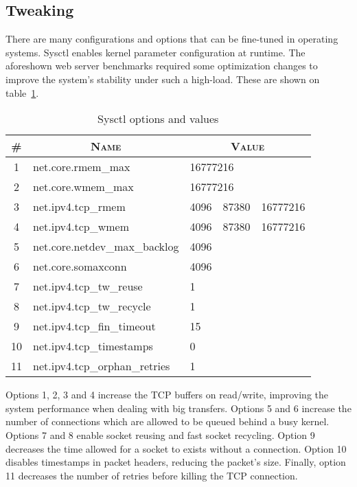 \subsection{Tweaking}
There are many configurations and options that can be fine-tuned in operating systems. Sysctl enables kernel parameter configuration at runtime. The aforeshown web server benchmarks required some optimization changes to improve the system's stability under such a high-load. These are shown on table~\ref{tab:sysctl}.
\begin{table}[ht]
  \centering
  
  \begin{tabular}{c|p{}|p{}}
  \multicolumn{1}{c|}{\textbf{\textsc{\#}}} & \multicolumn{1}{c|}{\textbf{\textsc{Name}}} & \multicolumn{1}{c}{\textbf{\textsc{Value}}} \\ \hline
  
  1 & net.core.rmem\_max & 16777216 \\ \hline
  2 & net.core.wmem\_max & 16777216 \\ \hline
  3 & net.ipv4.tcp\_rmem & 4096~\, 87380~\, 16777216 \\ \hline
  4 & net.ipv4.tcp\_wmem & 4096~\, 87380~\, 16777216 \\ \hline
  5 & net.core.netdev\_max\_backlog & 4096 \\ \hline
  6 & net.core.somaxconn & 4096 \\ \hline
  7 & net.ipv4.tcp\_tw\_reuse & 1 \\ \hline
  8 & net.ipv4.tcp\_tw\_recycle & 1 \\ \hline
  9 & net.ipv4.tcp\_fin\_timeout & 15 \\ \hline
  10 & net.ipv4.tcp\_timestamps & 0 \\ \hline
  11 & net.ipv4.tcp\_orphan\_retries & 1 \\
  
  \end{tabular}
  \caption{Sysctl options and values}
  \label{tab:sysctl}
\end{table}
Options 1, 2, 3 and 4 increase the TCP buffers on read/write, improving the system performance when dealing with big transfers. Options 5 and 6 increase the number of connections which are allowed to be queued behind a busy kernel. Options 7 and 8 enable socket reusing and fast socket recycling. Option 9 decreases the time allowed for a socket to exists without a connection. Option 10 disables timestamps in packet headers, reducing the packet's size. Finally, option 11 decreases the number of retries before killing the TCP connection.

